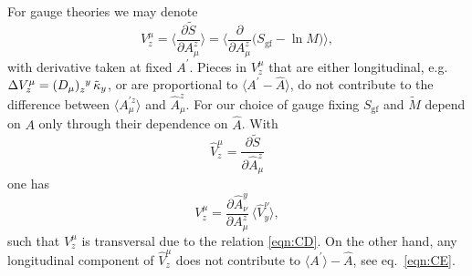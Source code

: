 \documentclass[twocolumn,aps,prd,amsmath,amssymb,preprintnumbers,longbibliography]{revtex4-1}
\numberwithin{equation}{section}
\begin{document}
\begin{appendices}
For gauge theories we may denote
\begin{equation}\label{eqn:EA11}
	V_z^\mu
	= \biggl\langle\frac{\partial \tilde{S}}{\partial A_\mu^z}\biggr\rangle
	= \biggl\langle\frac{\partial}{\partial A_\mu^z} \bigl(S_\text{gf} - \ln M\bigr)\biggr\rangle,
\end{equation}
with derivative taken at fixed $A^\prime$. Pieces in $V_z^\mu$ that are either longitudinal, e.g. $\Delta V_z^\mu = \tensor{(D_\mu)}{_z^y} \, \tilde\kappa_y$, or are proportional to $\langle A^\prime - \hat{A}\rangle$, do not contribute to the difference between $\langle A_\mu^{\prime z}\rangle$ and $\hat{A}_\mu^z$. For our choice of gauge fixing $S_\text{gf}$ and $\tilde{M}$ depend on $A$ only through their dependence on $\hat{A}$. With
\begin{equation}\label{eqn:GG1}
	\hat{V}_z^\mu
	= \frac{\partial \tilde{S}}{\partial \hat{A}_\mu^z}
\end{equation}
one has
\begin{equation}\label{eqn:GG2}
	V_z^\mu
	= \frac{\partial \hat{A}_\nu^y}{\partial A_\mu^z} \, \langle\hat{V}_y^\nu\rangle,
\end{equation}
such that $V_z^\mu$ is transversal due to the relation \eqref{eqn:CD}. On the other hand, any longitudinal component of $\hat{V}_z^\mu$ does not contribute to $\langle A^\prime\rangle - \hat{A}$, see eq.~\eqref{eqn:CE}.


\end{appendices}
\end{document}
